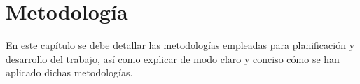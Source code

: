 \chapter{Metodología}
\label{cap:Metodologia}

En este capítulo se debe detallar las metodologías empleadas para planificación y desarrollo del trabajo, así como explicar de modo claro y conciso cómo se han aplicado dichas metodologías. 